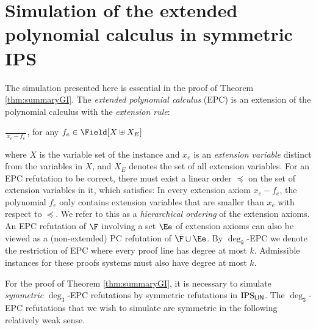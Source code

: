 \documentclass[a4paper,UKenglish,cleveref, autoref, thm-restate]{lipics-v2021}
\newcommand{\IPSlin}{\text{\upshape IPS}_{\mathsf{LIN}}}
\begin{document}
\section{Simulation of the extended polynomial calculus in symmetric IPS}
The simulation presented here is essential in the proof of Theorem \ref{thm:summaryGI}.
The \textit{extended polynomial calculus} (EPC) is an extension of the polynomial calculus with
the \textit{extension rule}:
\begin{center}
	{\Large$\frac{}{~  x_e - f_e ~}$},
	for any $f_e\in \Field[X \uplus X_E]$
\end{center}
where $X$ is the variable set of the instance and $x_e$ is an
\textit{extension variable} distinct from the variables in $X$, and $X_E$ denotes the set of all extension variables. For an EPC refutation to be correct, there must exist a linear order $\preceq$ on the set of extension variables in it, which satisfies: In every extension axiom $x_e - f_e$, the polynomial $f_e$ only contains extension variables that are smaller than $x_e$ with respect to $\preceq$. We refer to this as a \emph{hierarchical ordering} of the extension axioms. An EPC refutation of $\F$ involving a set $\Ee$ of extension axioms can also be viewed as a (non-extended) PC refutation of $\F \cup \Ee$. By $\deg_k$-EPC we denote the restriction of EPC where every proof line has degree at most $k$. Admissible instances for these proofs systems must also have degree at most $k$.

For the proof of Theorem \ref{thm:summaryGI}, it is necessary to simulate \emph{symmetric} $\deg_3$-EPC refutations by symmetric refutations in $\IPSlin$. The $\deg_3$-EPC refutations that we wish to simulate are symmetric in the following relatively weak sense.
\end{document}
